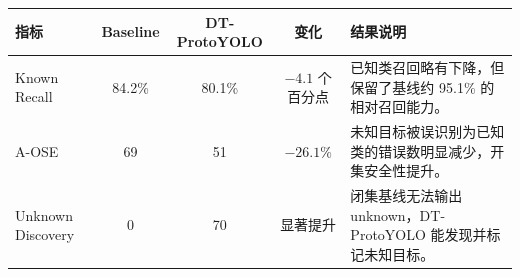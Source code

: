 \setlength{\tabcolsep}{3pt}
\begin{tabular}{p{2.6cm}ccc p{4.9cm}}
\toprule
指标 & Baseline & DT-ProtoYOLO & 变化 & 结果说明 \\
\midrule
Known Recall & 84.2\% & 80.1\% & $-4.1$ 个百分点 & 已知类召回略有下降，但保留了基线约 95.1\% 的相对召回能力。\\
A-OSE & 69 & 51 & $-26.1\%$ & 未知目标被误识别为已知类的错误数明显减少，开集安全性提升。\\
Unknown Discovery & 0 & 70 & 显著提升 & 闭集基线无法输出 unknown，DT-ProtoYOLO 能发现并标记未知目标。\\
\bottomrule
\end{tabular}
